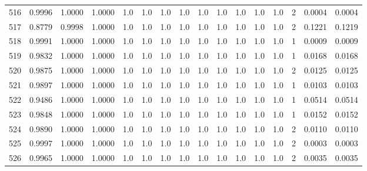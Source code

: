 \begin{tabular}{lrrrrrrrrrrrrrrr}
516 &      0.9996 &  1.0000 &  1.0000 &     1.0 &     1.0 &     1.0 &     1.0 &     1.0 &     1.0 &     1.0 &      1.0 &        1.0 &      2 &                    0.0004 &                     0.0004 \\
517 &      0.8779 &  0.9998 &  1.0000 &     1.0 &     1.0 &     1.0 &     1.0 &     1.0 &     1.0 &     1.0 &      1.0 &        1.0 &      2 &                    0.1221 &                     0.1219 \\
518 &      0.9991 &  1.0000 &  1.0000 &     1.0 &     1.0 &     1.0 &     1.0 &     1.0 &     1.0 &     1.0 &      1.0 &        1.0 &      1 &                    0.0009 &                     0.0009 \\
519 &      0.9832 &  1.0000 &  1.0000 &     1.0 &     1.0 &     1.0 &     1.0 &     1.0 &     1.0 &     1.0 &      1.0 &        1.0 &      1 &                    0.0168 &                     0.0168 \\
520 &      0.9875 &  1.0000 &  1.0000 &     1.0 &     1.0 &     1.0 &     1.0 &     1.0 &     1.0 &     1.0 &      1.0 &        1.0 &      2 &                    0.0125 &                     0.0125 \\
521 &      0.9897 &  1.0000 &  1.0000 &     1.0 &     1.0 &     1.0 &     1.0 &     1.0 &     1.0 &     1.0 &      1.0 &        1.0 &      1 &                    0.0103 &                     0.0103 \\
522 &      0.9486 &  1.0000 &  1.0000 &     1.0 &     1.0 &     1.0 &     1.0 &     1.0 &     1.0 &     1.0 &      1.0 &        1.0 &      1 &                    0.0514 &                     0.0514 \\
523 &      0.9848 &  1.0000 &  1.0000 &     1.0 &     1.0 &     1.0 &     1.0 &     1.0 &     1.0 &     1.0 &      1.0 &        1.0 &      1 &                    0.0152 &                     0.0152 \\
524 &      0.9890 &  1.0000 &  1.0000 &     1.0 &     1.0 &     1.0 &     1.0 &     1.0 &     1.0 &     1.0 &      1.0 &        1.0 &      2 &                    0.0110 &                     0.0110 \\
525 &      0.9997 &  1.0000 &  1.0000 &     1.0 &     1.0 &     1.0 &     1.0 &     1.0 &     1.0 &     1.0 &      1.0 &        1.0 &      2 &                    0.0003 &                     0.0003 \\
526 &      0.9965 &  1.0000 &  1.0000 &     1.0 &     1.0 &     1.0 &     1.0 &     1.0 &     1.0 &     1.0 &      1.0 &        1.0 &      2 &                    0.0035 &                     0.0035 \\

\end{tabular}

